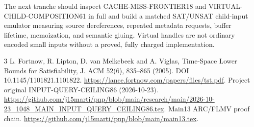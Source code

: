 \documentclass[11pt]{article}
\begin{document}
The next tranche should inspect CACHE-MISS-FRONTIER18 and VIRTUAL-CHILD-COMPOSITION61 in full and build a matched SAT/UNSAT child-input emulator measuring source dereferences, repeated metadata requests, buffer lifetime, memoization, and semantic gluing. Virtual handles are not ordinary encoded small inputs without a proved, fully charged implementation.

\begin{thebibliography}{3}
 L. Fortnow, R. Lipton, D. van Melkebeek and A. Viglas, Time-Space Lower Bounds for Satisfiability, J. ACM 52(6), 835--865 (2005). DOI 10.1145/1101821.1101822. \url{https://lance.fortnow.com/papers/files/tst.pdf}.
 Project original INPUT-QUERY-CEILING86 (2026-10-23). \url{https://github.com/j15marti/pnp/blob/main/research/main/2026-10-23_1048_MAIN_INPUT_QUERY_CEILING86.tex}.
 Main13 ARC/FLMV proof chain. \url{https://github.com/j15marti/pnp/blob/main/main13.tex}.
\end{thebibliography}
\end{document}
